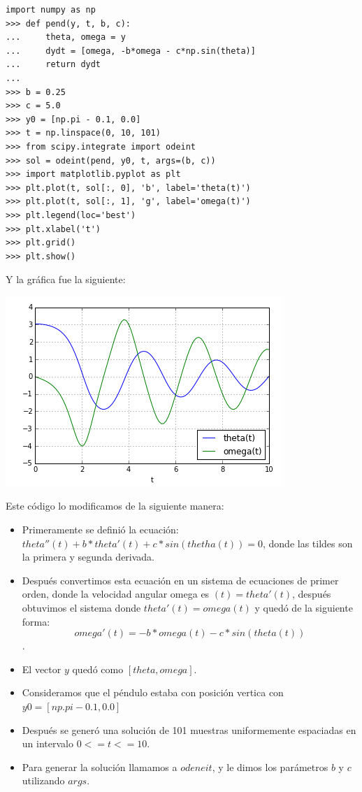 \documentclass[12pt,letterpaper]{article}
\begin{document}
\begin{verbatim}
import numpy as np
>>> def pend(y, t, b, c):
...     theta, omega = y
...     dydt = [omega, -b*omega - c*np.sin(theta)]
...     return dydt
...
>>> b = 0.25
>>> c = 5.0
>>> y0 = [np.pi - 0.1, 0.0]
>>> t = np.linspace(0, 10, 101)
>>> from scipy.integrate import odeint
>>> sol = odeint(pend, y0, t, args=(b, c))
>>> import matplotlib.pyplot as plt
>>> plt.plot(t, sol[:, 0], 'b', label='theta(t)')
>>> plt.plot(t, sol[:, 1], 'g', label='omega(t)')
>>> plt.legend(loc='best')
>>> plt.xlabel('t')
>>> plt.grid()
>>> plt.show()
\end{verbatim}
Y la gráfica fue la siguiente: 
\begin{center}
\includegraphics[scale=0.7]{act5.png}
\end{center}

Este código lo modificamos de la siguiente manera: 

\begin{itemize}
\item Primeramente se definió la ecuación: $ theta''(t) + b*theta'(t) + c*sin(thetha(t)) = 0 $, donde las tildes son la primera y segunda derivada.
\item Después convertimos esta ecuación en un sistema de ecuaciones de primer orden, donde la velocidad angular omega es $ (t) = theta'(t) $, después obtuvimos el sistema donde $ theta'(t) = omega(t) $ y quedó de la siguiente forma: $$ omega'(t) = -b*omega(t)-c*sin(theta(t)) $$.
\item El vector $y$ quedó como $[theta, omega]$.
\item Consideramos que el péndulo estaba con posición vertica con $y0 = [np.pi-0.1, 0.0]$
\item Después se generó una solución de 101 muestras uniformemente espaciadas en un intervalo $ 0 <= t <= 10 $.
\item Para generar la solución llamamos a $odeneit$, y le dimos los parámetros $b$ y $c$ utilizando $args$.
\end{itemize}
\end{document}
